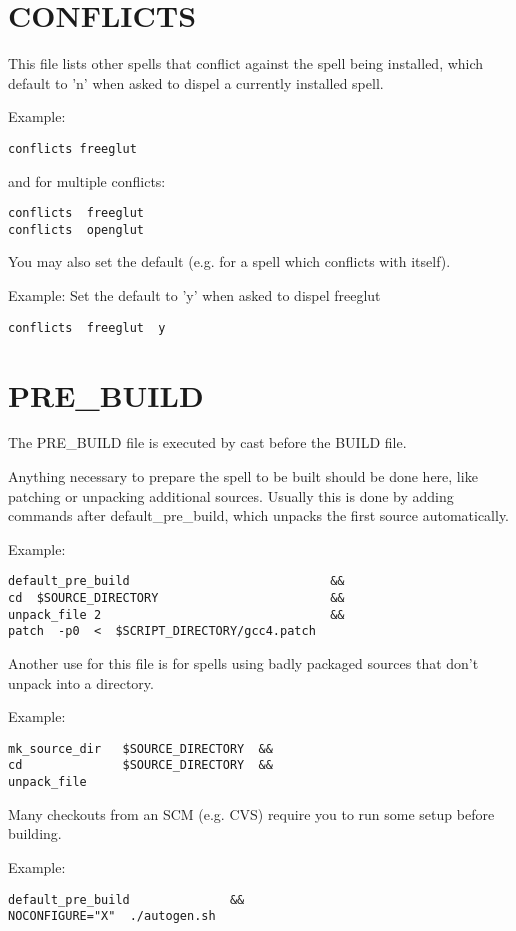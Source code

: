 \documentclass[a4paper,10pt]{book}
\begin{document}
\section{CONFLICTS}
This file lists other spells that conflict against the spell being installed,
which default to 'n' when asked to dispel a currently installed spell.

Example:
\begin{verbatim}
conflicts freeglut
\end{verbatim}

and for multiple conflicts:
\begin{verbatim}
conflicts  freeglut
conflicts  openglut
\end{verbatim}

You may also set the default (e.g. for a spell which conflicts with itself).

Example: Set the default to 'y' when asked to dispel freeglut
\begin{verbatim}
conflicts  freeglut  y
\end{verbatim}

\section{PRE\_BUILD}
The PRE\_BUILD file is executed by cast before the BUILD file.

Anything necessary to prepare the spell to be built should be done here, like
patching or unpacking additional sources. Usually this is done by adding
commands after default\_pre\_build, which unpacks the first source
automatically.

Example:
\begin{verbatim}
default_pre_build                            &&
cd  $SOURCE_DIRECTORY                        &&
unpack_file 2                                &&
patch  -p0  <  $SCRIPT_DIRECTORY/gcc4.patch
\end{verbatim}

Another use for this file is for spells using badly packaged sources that don't
unpack into a directory.

Example:
\begin{verbatim}
mk_source_dir   $SOURCE_DIRECTORY  &&
cd              $SOURCE_DIRECTORY  &&
unpack_file
\end{verbatim}

Many checkouts from an SCM (e.g. CVS) require you to run some setup before
building.

Example:
\begin{verbatim}
default_pre_build              &&
NOCONFIGURE="X"  ./autogen.sh
\end{verbatim}
\end{document}
